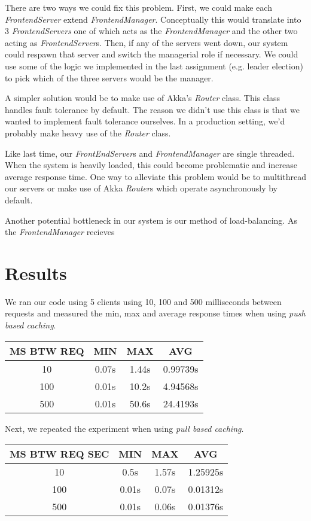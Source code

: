 \documentclass[11pt]{article}
\begin{document}
There are two ways we could fix this problem. First, we could make
each \emph{FrontendServer} extend \emph{FrontendManager}.
Conceptually this would translate into 3 \emph{FrontendServers} one of
which acts as the \emph{FrontendManager} and the other two acting as
\emph{FrontendServer}s.  Then, if any of the servers went down, our
system could respawn that server and switch the managerial role if
necessary.  We could use some of the logic we implemented in the last
assignment (e.g. leader election) to pick which of the three servers
would be the manager.

A simpler solution would be to make use of Akka's \emph{Router}
class.  This class handles fault tolerance by default.  The reason we
didn't use this class is that we wanted to implement fault tolerance
ourselves.  In a production setting, we'd probably make heavy use of
the \emph{Router} class.

Like last time, our \emph{FrontEndServer}s and \emph{FrontendManager}
are single threaded.  When the system is heavily loaded, this could
become problematic and increase average response time.  One way to
alleviate this problem would be to multithread our servers or make use
of Akka \emph{Router}s which operate asynchronously by default.

Another potential bottleneck in our system is our method of
load-balancing.  As the \emph{FrontendManager} recieves

\section{Results}
We ran our code using 5 clients using 10, 100 and 500 milliseconds
between requests and measured the min, max and average response
times when using \emph{push based caching}.

\begin{tabular}{c|c|c|c}
  MS BTW REQ & MIN & MAX & AVG \\
  \hline
  10  & 0.07s & 1.44s & 0.99739s \\
  100 & 0.01s & 10.2s & 4.94568s \\
  500 & 0.01s & 50.6s & 24.4193s \\
\end{tabular}

Next, we repeated the experiment when using \emph{pull based caching}.

\begin{tabular}{c|c|c|c}
  MS BTW REQ SEC & MIN & MAX & AVG \\
  \hline
  10  & 0.5s  & 1.57s & 1.25925s \\
  100 & 0.01s & 0.07s & 0.01312s \\
  500 & 0.01s & 0.06s & 0.01376s \\
\end{tabular}
\end{document}
